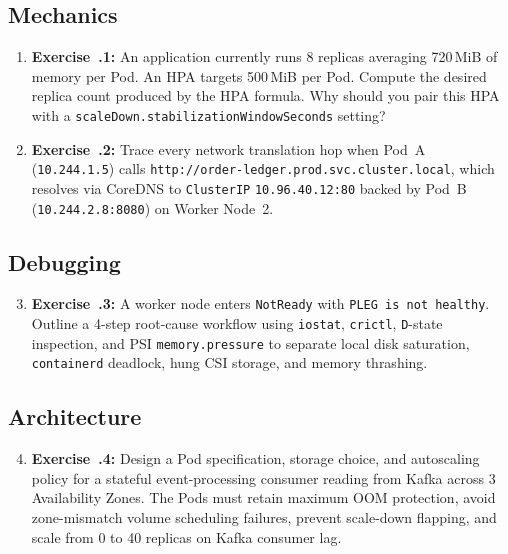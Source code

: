 \subsection{Mechanics}
\begin{enumerate}[leftmargin=18pt]
  \item \textbf{Exercise~\thechapter.1:} An application currently runs 8 replicas averaging 720\,MiB of memory per Pod. An HPA targets 500\,MiB per Pod. Compute the desired replica count produced by the HPA formula. Why should you pair this HPA with a \texttt{scaleDown.stabilizationWindowSeconds} setting?
  \item \textbf{Exercise~\thechapter.2:} Trace every network translation hop when Pod~A (\texttt{10.244.1.5}) calls \texttt{http://order-ledger.prod.svc.cluster.local}, which resolves via CoreDNS to \texttt{ClusterIP} \texttt{10.96.40.12:80} backed by Pod~B (\texttt{10.244.2.8:8080}) on Worker Node~2.
\end{enumerate}

\subsection{Debugging}
\begin{enumerate}[leftmargin=18pt]
  \setcounter{enumi}{2}
  \item \textbf{Exercise~\thechapter.3:} A worker node enters \texttt{NotReady} with \texttt{PLEG is not healthy}. Outline a 4-step root-cause workflow using \texttt{iostat}, \texttt{crictl}, \texttt{D}-state inspection, and PSI \texttt{memory.pressure} to separate local disk saturation, \texttt{containerd} deadlock, hung CSI storage, and memory thrashing.
\end{enumerate}

\subsection{Architecture}
\begin{enumerate}[leftmargin=18pt]
  \setcounter{enumi}{3}
  \item \textbf{Exercise~\thechapter.4:} Design a Pod specification, storage choice, and autoscaling policy for a stateful event-processing consumer reading from Kafka across 3 Availability Zones. The Pods must retain maximum OOM protection, avoid zone-mismatch volume scheduling failures, prevent scale-down flapping, and scale from 0 to 40 replicas on Kafka consumer lag.
\end{enumerate}

